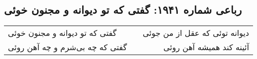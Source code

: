 \begin{center}
\section*{رباعی شماره ۱۹۴۱: گفتی که تو دیوانه و مجنون خوئی}
\label{sec:1941}
\begin{longtable}{l p{0.5cm} r}
گفتی که تو دیوانه و مجنون خوئی
&&
دیوانه توئی که عقل از من جوئی
\\
گفتی که چه بی‌شرم و چه آهن روئی
&&
آئینه کند همیشه آهن روئی
\\
\end{longtable}
\end{center}
